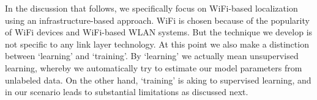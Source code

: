 In the discussion that follows, we specifically focus on WiFi-based localization using
an infrastructure-based approach. WiFi is chosen because of the popularity of WiFi devices and WiFi-based WLAN systems. But the technique we develop is not specific to any link layer technology. {\color{red} At this point we also make a distinction between `learning' and `training'. By `learning' we actually mean unsupervised learning, whereby we automatically try to estimate our model parameters from unlabeled data. On the other hand, `training' is aking to supervised learning, and in our scenario leads to substantial limitations as discussed next.}


%
%
%
%
%
%
%

